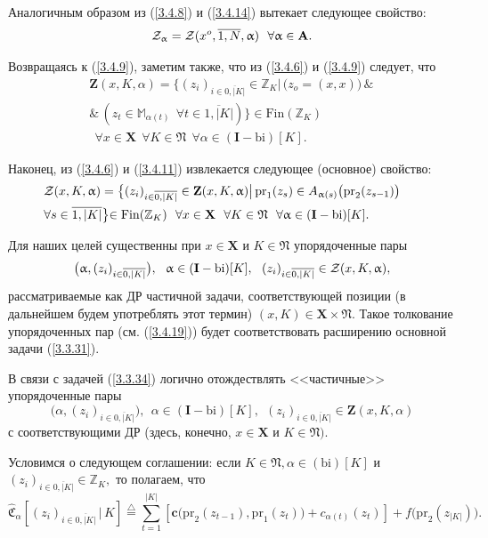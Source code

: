\documentclass[11pt,twoside,openany]{report}
\newcommand{\bfn}{\begin{equation}}
\newcommand{\efn}{\end{equation}}
\newcommand{\df}{\stackrel{\triangle}{=}}
\newcommand{\ov}{\overline}
\newcommand{\al}{\alpha}
\newcommand{\fa}{\forall}
\newcommand{\cz}{{\cal Z}}
\newcommand{\bbz}{{\mathbb Z}}
\newcommand{\bbm}{{\mathbb M}}
\begin{document}
Аналогичным образом из (\ref{3.4.8}) и (\ref{3.4.14})
вытекает следующее свойство:
\bfn
  \label{3.4.16}
  \cz_\al = \cz(x^o,\ov{1,N},\al) \ \ \fa \al\in \mathbf{A}
  .
\efn

Возвращаясь к (\ref{3.4.9}),
заметим также, что из (\ref{3.4.6}) и (\ref{3.4.9})
следует, что
\begin{eqnarray}
  &\mathbf{Z}(x,K,\al) = \bigl\{(z_i)_{i\in \ov{0,|K|}} \in \bbz_K\bigl|\,\bigl(z_o =
  (x,x)\bigl)\,\&\,
  &\nonumber\\
  &\&\,(z_t\in \bbm_{\al(t)}\ \ \fa t\in \ov{1,|K|})\bigl\}\in \mathrm{Fin}
  (\bbz_K)
  &\nonumber\\
  &\ \ \fa x\in \mathbf{X}\ \ \fa K\in \mathfrak{N}\ \ \fa \al\in (\mathbf{I}-\mathrm{bi})[K].
  &
  \label{3.4.17}
\end{eqnarray}

Наконец, из (\ref{3.4.6}) и (\ref{3.4.11})
извлекается следующее (основное) свойство:
\begin{eqnarray}
  &\cz(x,K,\al) = \bigl\{(z_i)_{i\in \ov{0,|K|}} \in \mathbf{Z}(x,K,\al)\bigl|\,\mathrm{pr}_1(z_s)
  \in A_{\al(s)}\bigl(\mathrm{pr}_2(z_{s-1})\bigl)\ \
  &\nonumber\\
  &\fa s\in \ov{1,|K|}\bigl\}\in \mathrm{Fin}(\bbz_K)\ \ \fa x\in \mathbf{X}\ \ \fa K\in
  \mathfrak{N}\ \ \fa \al\in (\mathbf{I}-\mathrm{bi})[K].
  &
  \label{3.4.18}
\end{eqnarray}

Для наших целей существенны при
$x\in \mathbf{X}$ и $K\in \mathfrak{N}$
упорядоченные пары
\bfn
  \label{3.4.19}
  \bigl(\al,(z_i)_{i\in\ov{0,|K|}}\bigl),\ \ \al\in
  (\mathbf{I}-\mathrm{bi})[K], \ \ (z_i)_{i\in\ov{0,|K|}}\in \cz(x,K,\al)
  ,
\efn
рассматриваемые как ДР частичной задачи,
соответствующей позиции
(в дальнейшем будем употреблять  этот термин)
$(x,K) \in \mathbf{X}\times \mathfrak{N}.$
Такое толкование упорядоченных пар
(см. (\ref{3.4.19})) будет соответствовать расширению основной задачи
(\ref{3.3.31}).

В связи с задачей (\ref{3.3.34})
логично отождествлять <<частичные>> упорядоченные пары
$$
  \bigl(\al,(z_i)_{i\in\ov{0,|K|}}\bigl),\ \ \al\in (\mathbf{I}-\mathrm{bi})[K], \ \
  (z_i)_{i\in\ov{0,|K|}}\in \mathbf{Z}(x,K,\al)
$$
с соответствующими ДР
(здесь, конечно,
$x\in \mathbf{X}$  и $K\in \mathfrak{N})$.

Условимся о следующем соглашении:
если $K\in \mathfrak{N}, \al\in (\mathrm{bi})[K]$ и
$(z_i)_{i\in\ov{0,|K|}}\in \bbz_K,$
то полагаем, что
\bfn
  \label{3.4.20}
  \widehat{\mathfrak{C}}_\al[(z_i)_{i\in\ov{0,|K|}}\,|\,K] \df
  \sum\limits_{t=1}^{|K|}[\mathbf{c}\bigl(\mathrm{pr}_2(z_{t-1}),\mathrm{pr}_1(z_t)\bigl)+
  c_{\al(t)}(z_t)] + f\bigl(\mathrm{pr}_2(z_{|K|})\bigl)
  .
\efn
\end{document}
